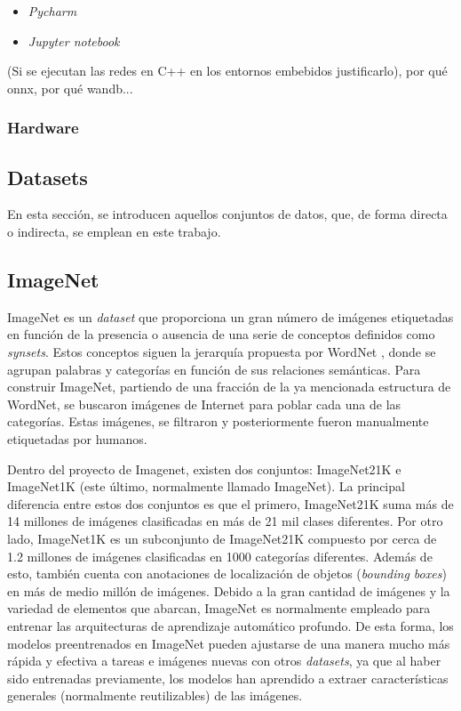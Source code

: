 \begin{itemize}
\begin{itemize}
		\item \textit{Pycharm}
		\item \textit{Jupyter notebook}
	\end{itemize}
\end{itemize}




(Si se ejecutan las redes en C++ en los entornos embebidos justificarlo), por qué onnx, por qué wandb... 


\subsubsection{Hardware}


\subsection{Datasets}
En esta sección, se introducen aquellos conjuntos de datos, que, de forma directa o indirecta, se emplean en este trabajo.

\subsection{ImageNet}
ImageNet \cite{imagenet_cvpr09, ILSVRC15} es un \textit{dataset} que proporciona un gran número de imágenes etiquetadas en función de la presencia o ausencia de una serie de conceptos definidos como \textit{synsets}. Estos conceptos siguen la jerarquía propuesta por WordNet \cite{wordnet}, donde se agrupan palabras y categorías en función de sus relaciones semánticas. Para construir ImageNet, partiendo de una fracción de la ya mencionada estructura de WordNet, se buscaron imágenes de Internet para poblar cada una de las categorías. Estas imágenes, se filtraron y posteriormente fueron manualmente etiquetadas por humanos. 

Dentro del proyecto de Imagenet, existen dos conjuntos: ImageNet21K e ImageNet1K (este último, normalmente llamado ImageNet). La principal diferencia entre estos dos conjuntos es que el primero, ImageNet21K suma más de 14 millones de imágenes clasificadas en más de 21 mil clases diferentes. Por otro lado, ImageNet1K es un subconjunto de ImageNet21K compuesto por cerca de 1.2 millones de imágenes clasificadas en 1000 categorías diferentes. Además de esto, también cuenta con anotaciones de localización de objetos (\textit{bounding boxes}) en más de medio millón de imágenes. Debido a la gran cantidad de imágenes y la variedad de elementos que abarcan, ImageNet es normalmente empleado para entrenar las arquitecturas de aprendizaje automático profundo. De esta forma, los modelos preentrenados en ImageNet pueden ajustarse de una manera mucho más rápida y efectiva a tareas e imágenes nuevas con otros \textit{datasets}, ya que al haber sido entrenadas previamente, los modelos han aprendido a extraer características generales (normalmente reutilizables) de las imágenes.

